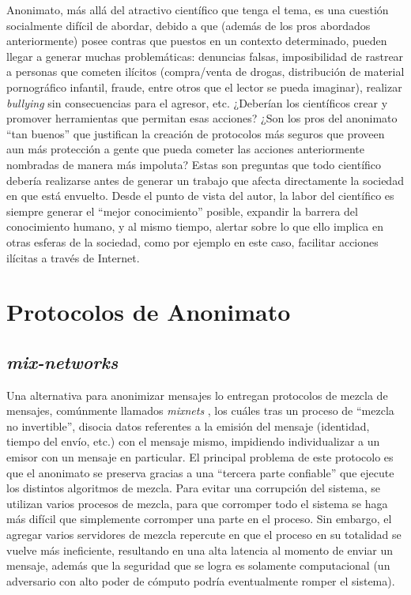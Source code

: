 Anonimato, más allá del atractivo científico que tenga el tema, es una cuestión socialmente difícil de abordar, debido a que (además de los pros abordados anteriormente) posee contras que puestos en un contexto determinado, pueden llegar a generar muchas problemáticas: denuncias falsas, imposibilidad de rastrear a personas que cometen ilícitos (compra/venta de drogas, distribución de material pornográfico infantil, fraude, entre otros que el lector se pueda imaginar), realizar \emph{bullying} sin consecuencias para el agresor, etc. ¿Deberían los científicos crear y promover herramientas que permitan esas acciones? ¿Son los pros del anonimato ``tan buenos'' que justifican la creación de protocolos más seguros que proveen aun más protección a gente que pueda cometer las acciones anteriormente nombradas de manera más impoluta? Estas son preguntas que todo científico debería realizarse antes de generar un trabajo que afecta directamente la sociedad en que está envuelto. Desde el punto de vista del autor, la labor del científico es siempre generar el ``mejor conocimiento'' posible, expandir la barrera del conocimiento humano, y al mismo tiempo, alertar sobre lo que ello implica en otras esferas de la sociedad, como por ejemplo en este caso, facilitar acciones ilícitas a través de Internet. 

\section{Protocolos de Anonimato}

\subsection{\emph{mix-networks}}

Una alternativa para anonimizar mensajes lo entregan protocolos de mezcla de mensajes, comúnmente llamados \emph{mixnets} \cite{chaum1981untraceable}, los cuáles tras un proceso de ``mezcla no invertible'', disocia datos referentes a la emisión del mensaje (identidad, tiempo del envío, etc.) con el mensaje mismo, impidiendo individualizar a un emisor con un mensaje en particular. El principal problema de este protocolo es que el anonimato se preserva gracias a una ``tercera parte confiable'' que ejecute los distintos algoritmos de mezcla. Para evitar una corrupción del sistema, se utilizan varios procesos de mezcla, para que corromper todo el sistema se haga más difícil que simplemente corromper una parte en el proceso. Sin embargo, el agregar varios servidores de mezcla repercute en que el proceso en su totalidad se vuelve más ineficiente, resultando en una alta latencia al momento de enviar un mensaje, además que la seguridad que se logra es solamente computacional (un adversario con alto poder de cómputo podría eventualmente romper el sistema).

